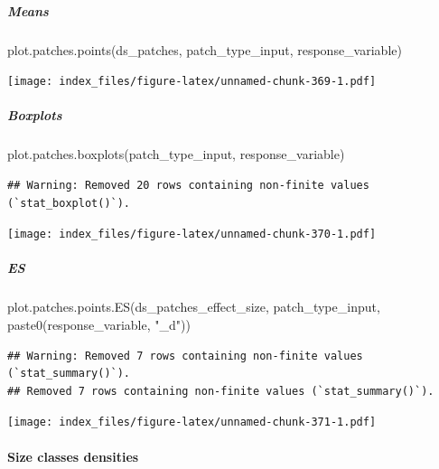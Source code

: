 \documentclass[
]{article}
\newenvironment{Shaded}{\begin{snugshade}}{\end{snugshade}}
\newcommand{\FunctionTok}[1]{\textcolor[rgb]{0.00,0.00,0.00}{#1}}
\newcommand{\NormalTok}[1]{#1}
\newcommand{\StringTok}[1]{\textcolor[rgb]{0.31,0.60,0.02}{#1}}
\begin{document}
\hypertarget{means-34}{%
\subparagraph{Means}\label{means-34}}

\begin{Shaded}
\begin{Highlighting}[]
\FunctionTok{plot.patches.points}\NormalTok{(ds\_patches, patch\_type\_input,}
\NormalTok{                       response\_variable)}
\end{Highlighting}
\end{Shaded}

\texttt{[image: index\_files/figure-latex/unnamed-chunk-369-1.pdf]}

\hypertarget{boxplots-32}{%
\subparagraph{Boxplots}\label{boxplots-32}}

\begin{Shaded}
\begin{Highlighting}[]
\FunctionTok{plot.patches.boxplots}\NormalTok{(patch\_type\_input,}
\NormalTok{                       response\_variable)}
\end{Highlighting}
\end{Shaded}

\begin{verbatim}
## Warning: Removed 20 rows containing non-finite values (`stat_boxplot()`).
\end{verbatim}

\texttt{[image: index\_files/figure-latex/unnamed-chunk-370-1.pdf]}

\hypertarget{es-14}{%
\subparagraph{ES}\label{es-14}}

\begin{Shaded}
\begin{Highlighting}[]
\FunctionTok{plot.patches.points.ES}\NormalTok{(ds\_patches\_effect\_size, patch\_type\_input,}
                       \FunctionTok{paste0}\NormalTok{(response\_variable, }\StringTok{"\_d"}\NormalTok{))}
\end{Highlighting}
\end{Shaded}

\begin{verbatim}
## Warning: Removed 7 rows containing non-finite values (`stat_summary()`).
## Removed 7 rows containing non-finite values (`stat_summary()`).
\end{verbatim}

\texttt{[image: index\_files/figure-latex/unnamed-chunk-371-1.pdf]}

\hypertarget{size-classes-densities-2}{%
\paragraph{Size classes densities}\label{size-classes-densities-2}}
\end{document}
